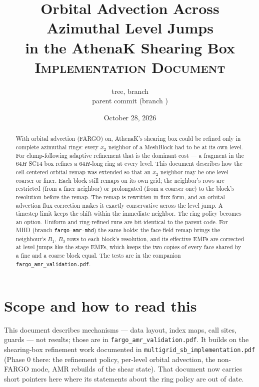 \documentclass[11pt]{article}
\title{Orbital Advection Across Azimuthal Level Jumps\\
       in the AthenaK Shearing Box\\[0.4em]
       \large \textsc{Implementation Document}}
\author{\code{athenak-multigrid} tree, branch \code{fargo-amr}\\
        \small parent commit \code{d3edb948} (branch \code{dust-multigrid})}
\date{October 28, 2026}
\newcommand{\code}[1]{\texttt{#1}}
\newcommand{\file}[1]{\texttt{\small #1}}
\begin{document}
\maketitle

\begin{abstract}
\noindent
With orbital advection (FARGO) on, AthenaK's shearing box could be refined only in
complete azimuthal rings: every $x_2$ neighbor of a MeshBlock had to be at its own level.
For clump-following adaptive refinement that is the dominant cost --- a fragment in the
$64H$ SC14 box refines a $64H$-long ring at every level. This document describes how the
cell-centered orbital remap was extended so that an $x_2$ neighbor may be one level
coarser or finer. Each block still remaps on its own grid; the neighbor's rows are
restricted (from a finer neighbor) or prolongated (from a coarser one) to the block's
resolution before the remap. The remap is rewritten in flux form, and an orbital-advection
flux correction makes it exactly conservative across the level jump. A timestep limit
keeps the shift within the immediate neighbor. The ring policy becomes an option. Uniform
and ring-refined runs are bit-identical to the parent code. For MHD (branch
\code{fargo-amr-mhd}) the same holds: the face-field remap brings the neighbour's $B_1$,
$B_3$ rows to each block's resolution, and its effective EMFs are corrected at level jumps
like the stage EMFs, which keeps the two copies of every face shared by a fine and a coarse
block equal.
The tests are in the companion \file{fargo\_amr\_validation.pdf}.
\end{abstract}

\tableofcontents
\newpage

\section{Scope and how to read this}
\label{sec:scope}

This document describes mechanisms --- data layout, index maps, call sites, guards ---
not results; those are in \file{fargo\_amr\_validation.pdf}. It builds on the shearing-box
refinement work documented in \file{multigrid\_sb\_implementation.pdf} (Phase 0 there:
the refinement policy, per-level orbital advection, the non-FARGO mode, AMR rebuilds of
the shear state). That document now carries short pointers here where its statements
about the ring policy are out of date.
\end{document}
